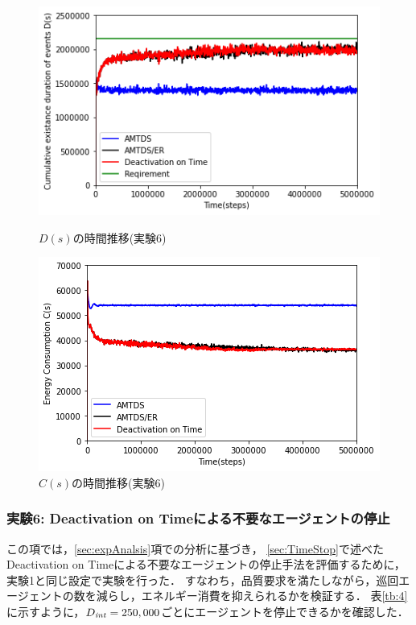 \documentclass[12pt,a4j,twoside]{jarticle}
\def\DeactCheckInterval{D_{\it int}}
\begin{document}
  
  \begin{figure}
    \centering
    \includegraphics[width=0.9\hsize]{figures/ds_graph_3600_ave_TimeStop_Office_600.png}
    \caption{$D(s)$の時間推移(実験6)}
    \label{fig:ds_TimeStop}
    \vspace{12pt}
    \centering
    \includegraphics[width=0.9\hsize]{figures/cs_graph_3600_ave_TimeStop_Office_600.png}
    \caption{$C(s)$の時間推移(実験6)}
    \label{fig:cs_TimeStop}
  \end{figure}


  \subsubsection{実験6: Deactivation on Timeによる不要なエージェントの停止}\label{ex:ER6}
  この項では，\ref{sec:expAnalsis}項での分析に基づき，
  \ref{sec:TimeStop}で述べたDeactivation on Timeによる不要なエージェントの停止手法を評価するために，
  実験1と同じ設定で実験を行った．
  すなわち，品質要求を満たしながら，巡回エージェントの数を減らし，エネルギー消費を抑えられるかを検証する．
  表\ref{tb:4}に示すように，$\DeactCheckInterval = 250,000$ごとにエージェントを停止できるかを確認した．
  \par
\end{document}
